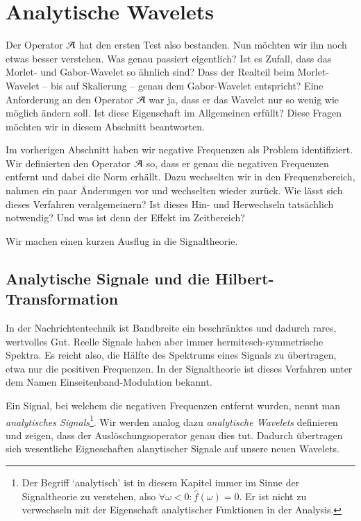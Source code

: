 \section{Analytische Wavelets}
Der Operator $\Ana\,$ hat den ersten Test also bestanden.
Nun möchten wir ihn noch etwas besser verstehen.
Was genau passiert eigentlich?
Ist es Zufall, dass das Morlet- und Gabor-Wavelet so ähnlich sind?
Dass der Realteil beim Morlet-Wavelet -- bis auf Skalierung -- genau dem Gabor-Wavelet entspricht?
Eine Anforderung an den Operator $\Ana\,$ war ja, dass er das Wavelet nur so wenig wie möglich ändern soll.
Ist diese Eigenschaft im Allgemeinen erfüllt?
Diese Fragen möchten wir in diesem Abschnitt beantworten.

Im vorherigen Abschnitt haben wir negative Frequenzen als Problem identifiziert.
Wir definierten den Operator $\Ana\,$ so, dass er genau die negativen Frequenzen entfernt und dabei die Norm erhällt.
Dazu wechselten wir in den Frequenzbereich, nahmen ein paar Änderungen vor und wechselten wieder zurück.
Wie lässt sich dieses Verfahren veralgemeinern? 
Ist dieses Hin- und Herwechseln tatsächlich notwendig?
Und was ist denn der Effekt im Zeitbereich?

Wir machen einen kurzen Ausflug in die Signaltheorie.


\subsection{Analytische Signale und die Hilbert-Transformation}
In der Nachrichtentechnik ist Bandbreite ein beschränktes und dadurch rares, wertvolles Gut.
Reelle Signale haben aber immer hermitesch-symmetrische Spektra.
Es reicht also, die Hälfte des Spektrums eines Signals zu übertragen, etwa nur die positiven Frequenzen.
In der Signaltheorie ist dieses Verfahren unter dem Namen Einseitenband-Modulation bekannt.

Ein Signal, bei welchem die negativen Frequenzen entfernt wurden, nennt man \emph{analytisches Signals}\footnote{
	Der Begriff `analytisch' ist in diesem Kapitel immer im Sinne der Signaltheorie zu verstehen, also $\forall \omega < 0 \colon \hat f (\omega) = 0 $.
	Er ist nicht zu verwechseln mit der Eigenschaft analytischer Funktionen in der Analysis.
}.
Wir werden analog dazu \emph{analytische Wavelets} definieren und zeigen, dass der Auslöschungsoperator genau dies tut.
Dadurch übertragen sich wesentliche Eigneschaften alanytischer Signale auf unsere neuen Wavelets.

